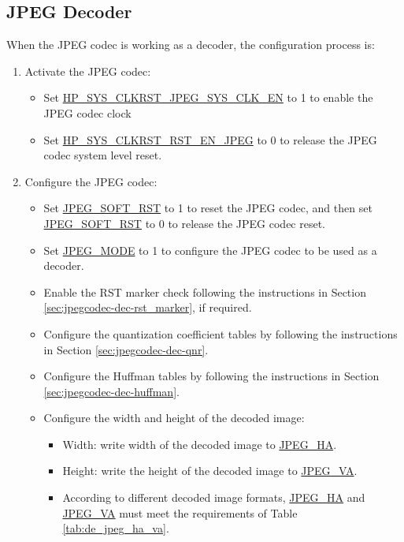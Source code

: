 \documentclass[main\_\_EN.tex]{subfiles}
\begin{document}
\subsection{JPEG Decoder}

\label{sec:jpegcodec-dec-prog}
When the JPEG codec is working as a decoder, the configuration process is:
\begin{enumerate}
    \item Activate the JPEG codec:
    \begin{itemize}
        \item Set \hyperref[fielddesc:HPSYSCLKRSTJPEGSYSCLKEN]{HP\_SYS\_CLKRST\_JPEG\_SYS\_CLK\_EN} to 1 to enable the JPEG codec clock
        \item Set \hyperref[fielddesc:HPSYSCLKRSTRSTENJPEG]{HP\_SYS\_CLKRST\_RST\_EN\_JPEG} to 0 to release the JPEG codec system level reset.
    \end{itemize}
    \item Configure the JPEG codec:
    \begin{itemize}
        \item Set \hyperref[fielddesc:JPEGSOFTRST]{JPEG\_SOFT\_RST} to 1 to reset the JPEG codec, and then set \hyperref[fielddesc:JPEGSOFTRST]{JPEG\_SOFT\_RST} to 0 to release the JPEG codec reset.
        \item Set \hyperref[fielddesc:JPEGMODE]{JPEG\_MODE} to 1 to configure the JPEG codec to be used as a decoder.
        \item Enable the RST marker check following the instructions in Section \ref{sec:jpegcodec-dec-rst_marker}, if required.
        \item Configure the quantization coefficient tables by following the instructions in Section \ref{sec:jpegcodec-dec-qnr}.
        \item Configure the Huffman tables by following the instructions in Section \ref{sec:jpegcodec-dec-huffman}.
        \item Configure the width and height of the decoded image:
        \begin{itemize}
            \item Width: write width of the decoded image to \hyperref[fielddesc:JPEGHA]{JPEG\_HA}.
            \item Height: write the height of the decoded image to \hyperref[fielddesc:JPEGVA]{JPEG\_VA}.
            \item According to different decoded image formats, \hyperref[fielddesc:JPEGHA]{JPEG\_HA} and \hyperref[fielddesc:JPEGVA]{JPEG\_VA} must meet the requirements of Table \ref{tab:de_jpeg_ha_va}.


\end{itemize}
\end{itemize}
\end{enumerate}
\end{document}

